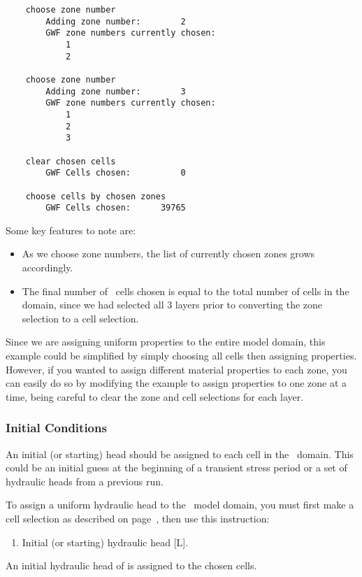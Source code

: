 {\begin{verbatim}
    choose zone number
    	Adding zone number:        2
    	GWF zone numbers currently chosen:
    	    1
    	    2

    choose zone number
    	Adding zone number:        3
    	GWF zone numbers currently chosen:
    	    1
    	    2
    	    3

    clear chosen cells
    	GWF Cells chosen:          0

    choose cells by chosen zones
    	GWF Cells chosen:      39765
\end{verbatim}

Some key features to note are:
\begin{itemize}
    \item As we choose zone numbers, the list of currently chosen zones grows accordingly.
    \item The final number of \gwf\ cells chosen is equal to the total number of cells in the domain, since we had selected all 3 layers prior to converting the  zone selection to a cell selection.
\end{itemize}
Since we are assigning uniform properties to the entire model domain, this example could be simplified by simply choosing all cells then assigning properties.  However, if you wanted to assign different material properties to each zone, you can easily do so by modifying the example to assign properties to one zone at a time, being careful to clear the zone and cell selections for each layer.

\subsubsection{Initial Conditions}  
An initial (or starting) head should be assigned to each cell in the \gwf\ domain.  This could be an initial guess at the beginning of a transient stress period or a set of hydraulic heads from a previous run.

To assign a uniform hydraulic head to the \gwf\ model domain, you must first make a cell selection as described on page~\pageref{page:cellSelect}, then use this instruction:

    {
        \squish
        \begin{enumerate}
        \item {}  Initial (or starting) hydraulic head [L].
        \end{enumerate}
          An initial hydraulic head  of  is assigned to the chosen cells.
    }

}
